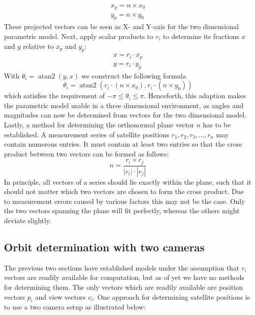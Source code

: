 \documentclass[11pt,a4paper]{article}
\DeclareMathOperator{\atantwo}{atan2}
\begin{document}
	\begin{equation}
		\begin{aligned}
			x_p=n\times x_0 \\
			y_p=n\times y_0
		\end{aligned}
	\end{equation}
	These projected vectors can be seen as X- and Y-axis for the two dimensional parametric model. Next, apply scalar products to $r_i$ to determine its fractions $x$ and $y$ relative to $x_p$ and $y_p$:
	\begin{equation}
		\begin{aligned}
			x=r_i\cdot x_p \\
			y=r_i\cdot y_p
		\end{aligned}
	\end{equation}
	With $\theta_i = \atantwo(y, x)$ we construct the following formula
	\begin{equation}
		\label{theta_3d}
		\boxed{\theta_i=\atantwo(r_i\cdot(n\times x_0), r_i\cdot(n\times y_0))}
	\end{equation}
	which satisfies the requirement of $-\pi \leq \theta_i \leq \pi$. Henceforth, this adaption makes the parametric model usable in a three dimensional environment, as angles and magnitudes can now be determined from vectors for the two dimensional model.\newline
	Lastly, a method for determining the orthonormal plane vector $n$ has to be established. A measurement series of satellite positions $r_1, r_2, r_3,..., r_n$ may contain numerous entries. It must contain at least two entries so that the cross product between two vectors can be formed as follows:
	\begin{equation}
		\label{normal_plane}
		\boxed{n=\frac{r_i\times r_j}{|r_i|\cdot|r_j|}}
	\end{equation}
	\noindent
	In principle, all vectors of a series should lie exactly within the plane, such that it should not matter which two vectors are chosen to form the cross product. Due to measurement errors caused by various factors this may not be the case. Only the two vectors spanning the plane will fit perfectly, whereas the others might deviate slightly.
	
	\subsection{Orbit determination with two cameras}
	\label{sec:orbit_two_cameras}
	The previous two sections have established models under the assumption that $r_i$ vectors are readily available for computation, but as of yet we have no methods for determining them. The only vectors which are readily available are position vectors $p_i$ and view vectors $v_i$. One approach for determining satellite positions is to use a two camera setup as illustrated below:
	
\end{document}
